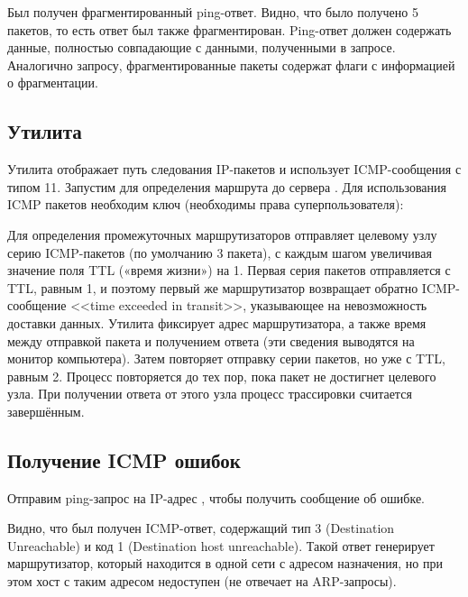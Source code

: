 Был получен фрагментированный ping-ответ. Видно, что было получено 5 пакетов, то есть ответ был также фрагментирован. Ping-ответ должен содержать данные, полностью совпадающие с данными, полученными в запросе. Аналогично запросу, фрагментированные пакеты содержат флаги с информацией о фрагментации.

\subsection{Утилита }

Утилита  отображает путь следования IP-пакетов и использует ICMP-сообщения с типом 11. Запустим  для определения маршрута до сервера . Для использования ICMP пакетов необходим ключ  (необходимы права суперпользователя):



\vspace{-2.2em}

Для определения промежуточных маршрутизаторов  отправляет целевому узлу серию ICMP-пакетов (по умолчанию 3 пакета), с каждым шагом увеличивая значение поля TTL («время жизни») на 1. Первая серия пакетов отправляется с TTL, равным 1, и поэтому первый же маршрутизатор возвращает обратно ICMP-сообщение <<time exceeded in transit>>, указывающее на невозможность доставки данных. Утилита фиксирует адрес маршрутизатора, а также время между отправкой пакета и получением ответа (эти сведения выводятся на монитор компьютера). Затем  повторяет отправку серии пакетов, но уже с TTL, равным 2. Процесс повторяется до тех пор, пока пакет не достигнет целевого узла. При получении ответа от этого узла процесс трассировки считается завершённым.

\subsection{Получение ICMP ошибок}

Отправим ping-запрос на IP-адрес , чтобы получить сообщение об ошибке.




Видно, что был получен ICMP-ответ, содержащий тип 3 (Destination Unreachable) и код 1 (Destination host unreachable). Такой ответ генерирует маршрутизатор, который находится в одной сети с адресом назначения, но при этом хост с таким адресом недоступен (не отвечает на ARP-запросы).

